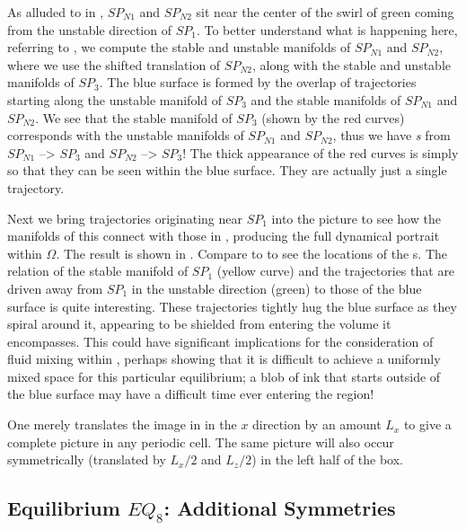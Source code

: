 \documentclass[lineno]{jfm}
\begin{document}
As alluded to in , $SP_{N1}$ and $SP_{N2}$ 
sit near the center of the swirl of green coming from the unstable 
direction of $SP_1$. To better understand what is happening here, 
referring to , we compute the  stable and 
unstable manifolds of $SP_{N1}$ and $SP_{N2}$, where we use the shifted 
translation of $SP_{N2}$, along with the stable and unstable manifolds of 
$SP_3$. The blue surface is formed by the overlap of trajectories 
starting along the unstable manifold of $SP_3$ and the stable manifolds 
of $SP_{N1}$ and $SP_{N2}$.  We see that the stable manifold of $SP_3$ 
(shown by the red curves) corresponds with the unstable manifolds of 
$SP_{N1}$ and $SP_{N2}$, thus we have \emph{{\hc}s} from $SP_{N1}$ --> 
$SP_3$ and $SP_{N2}$ --> $SP_3$! The thick appearance of the red curves 
is simply so that they can be seen within the blue surface. They are 
actually just a single trajectory. 
 
Next we bring trajectories originating near $SP_1$ into the picture to 
see how the manifolds of this {\stagp} connect with those in 
, producing the full dynamical portrait within 
$\Omega$.  The result is shown in . Compare to 
 to see the locations of the {\stagp}s. 
The relation of the stable manifold of $SP_1$ (yellow curve) and the 
trajectories that are driven away from $SP_1$ in the unstable direction 
(green) to those of the blue surface is quite interesting. These 
trajectories tightly hug the blue surface as they spiral around it, 
appearing to be shielded from entering the volume it encompasses. This 
could have significant implications for the consideration of fluid mixing 
within {\pCf}, perhaps showing that it is difficult to achieve a 
uniformly mixed space for this particular equilibrium; a blob of ink that 
starts outside of the blue surface may have a difficult time ever 
entering the region! 
 
One merely translates the image in  in the $x$ 
direction by an amount $L_{x}$ to give a complete picture in any periodic 
cell. The same picture will also occur symmetrically (translated by 
$L_{x}/2$ and $L_{z}/2$) in the left half of the box. 


\subsection{Equilibrium $EQ_8$: Additional Symmetries}
\label{sect:EQ8}
\end{document}
